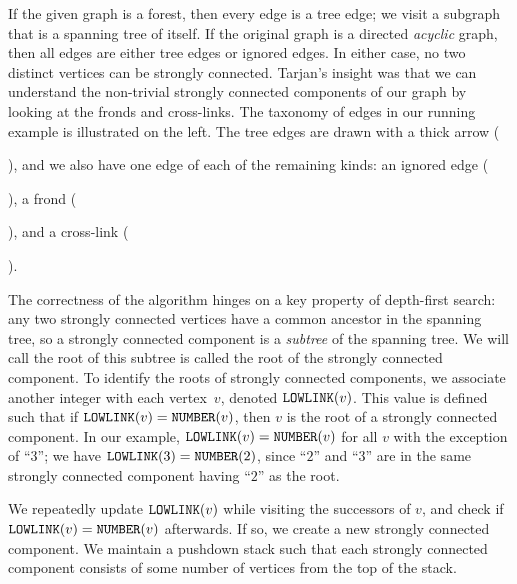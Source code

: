 \documentclass[../generics]{subfiles}
\begin{document}
If the given graph is a forest, then every edge is a tree edge; we visit a subgraph that is a spanning tree of itself. If the original graph is a directed \emph{acyclic} graph, then all edges are either tree edges or ignored edges. In either case, no two distinct vertices can be strongly connected. Tarjan's insight was that we can understand the non-trivial strongly connected components of our graph by looking at the fronds and cross-links. The taxonomy of edges in our running example is illustrated on the left. The tree edges are drawn with a thick arrow (), and we also have one edge of each of the remaining kinds: an ignored edge
(), a frond
(), and a cross-link
().

The correctness of the algorithm hinges on a key property of depth-first search: any two strongly connected vertices have a common ancestor in the spanning tree, so a strongly connected component is a \emph{subtree} of the spanning tree. We will call the root of this subtree is called the root of the strongly connected component. To identify the roots of strongly connected components, we associate another integer with each vertex~$v$, denoted $\texttt{LOWLINK}(v)$. This value is defined such that if $\texttt{LOWLINK}(v)=\texttt{NUMBER}(v)$, then $v$ is the root of a strongly connected component. In our example, $\texttt{LOWLINK}(v)=\texttt{NUMBER}(v)$ for all $v$ with the exception of ``$3$''; we have $\texttt{LOWLINK}(3)=\texttt{NUMBER}(2)$, since ``$2$'' and ``$3$'' are in the same strongly connected component having ``$2$'' as the root.

We repeatedly update $\texttt{LOWLINK}(v)$ while visiting the successors of $v$, and check if $\texttt{LOWLINK}(v)=\texttt{NUMBER}(v)$ afterwards. If so, we create a new strongly connected component. We maintain a pushdown stack such that each strongly connected component consists of some number of vertices from the top of the stack.
\end{document}
